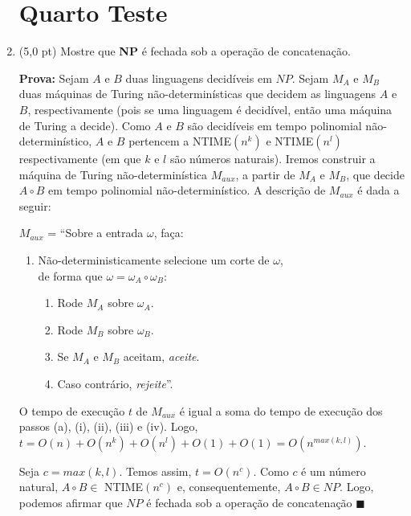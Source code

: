 \documentclass[12pt,a4paper,oneside]{article}
\begin{document}
\begin{enumerate}
	
	\section*{Quarto Teste}
	
	\item (5,0 pt) Mostre que {\bf NP} é fechada sob a operação de concatenação. \\
	
	{\color{verde}
		{\bf Prova:} Sejam $A$ e $B$ duas linguagens decidíveis em $NP$. Sejam $M_A$ e $M_B$ duas máquinas de Turing não-determinísticas que decidem as linguagens $A$ e $B$, respectivamente (pois se uma linguagem é decidível, então uma máquina de Turing a decide). Como $A$ e $B$ são decidíveis em tempo polinomial não-determinístico, $A$ e $B$ pertencem a {\sc NTIME}$(n^k)$ e {\sc NTIME}$(n^l)$ respectivamente (em que $k$ e $l$ são números naturais).  Iremos construir a máquina de Turing não-determinística $M_{aux}$, a partir de $M_A$ e $M_B$, que decide $A \circ B$ em tempo polinomial não-determinístico. A descrição de $M_{aux}$ é dada a seguir:
			
			$M_{aux}$ = ``Sobre a entrada $\omega$, faça:
			\begin{enumerate}
				\item Não-deterministicamente selecione um corte de $\omega$, \\de forma que $\omega = \omega_A \circ \omega_B$:
				\begin{enumerate}
					\item Rode $M_A$ sobre $\omega_A$.
					\item Rode $M_B$ sobre $\omega_B$.
					\item Se $M_A$ e $M_B$ aceitam, {\it aceite}.
					\item Caso contrário, {\it rejeite}''.
				\end{enumerate}
			\end{enumerate}
			
			O tempo de execução $t$ de $M_{aux}$ é igual a soma do tempo de execução dos passos (a), (i), (ii), (iii) e (iv). Logo, $t = O(n) + O(n^k) + O(n^l) + O(1) + O(1) = O(n^{max(k,l)})$. 
			
			Seja  $c = max(k,l)$. Temos assim, $t = O(n^c)$. Como $c$ é um número natural, $A \circ B \in$ {\sc NTIME}$(n^c)$ e, consequentemente, $A \circ B \in NP$. Logo, podemos afirmar que $NP$ é fechada sob a operação de concatenação $\blacksquare$
	}
	

\end{enumerate}
\end{document}
